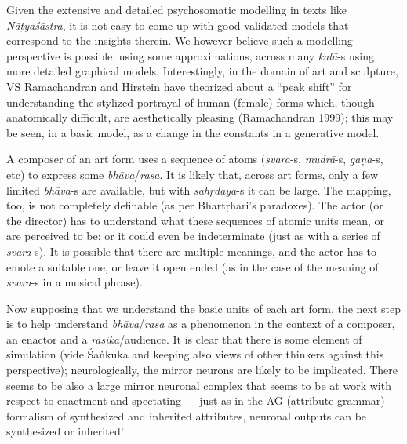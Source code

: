  Given the extensive and detailed psychosomatic modelling in texts like \textsl{Nāṭyaśāstra}, it is not easy to come up with good validated models that correspond to the insights therein. We however believe such a modelling perspective is possible, using some approximations, across many \textsl{kalā}-s using more detailed graphical models. Interestingly, in the domain of art and sculpture, VS Ramachandran and Hirstein have theorized about a “peak shift” for understanding the stylized portrayal of human (female) forms which, though anatomically difficult, are aesthetically pleasing (Ramachandran 1999); this may be seen, in a basic model, as a change in the constants in a generative model.

A composer of an art form uses a sequence of atoms (\textsl{svara}-s, \hbox{\textsl{mudrā}-s}, \textsl{gaṇa}-s, etc) to express some \textsl{bhāva}/\textsl{rasa}. It is likely that, across art forms, only a few limited \textsl{bhāva}-s are available, but with \textsl{sahṛdaya}-s it can be large. The mapping, too, is not completely definable (as per Bhartṛhari’s paradoxes). The actor (or the director) has to understand what these sequences of atomic units mean, or are perceived to be; or it could even be indeterminate (just as with a series of \textsl{svara}-s). It is possible that there are multiple meanings, and the actor has to emote a suitable one, or leave it open ended (as in the case of the meaning of \textsl{svara}-s in a musical phrase).

Now supposing that we understand the basic units of each art form, the next step is to help understand \textsl{bhāva}/\textsl{rasa} as a phenomenon in the context of a composer, an enactor and a \textsl{rasika}/audience. It is clear that there is some element of simulation (vide Śaṅkuka and keeping also views of other thinkers against this perspective); neurologically, the mirror neurons are likely to be implicated. There seems to be also a large mirror neuronal complex that seems to be at work with respect to enactment and spectating --- just as in the AG (attribute grammar) formalism of synthesized and inherited attributes, neuronal outputs can be synthesized or inherited!

